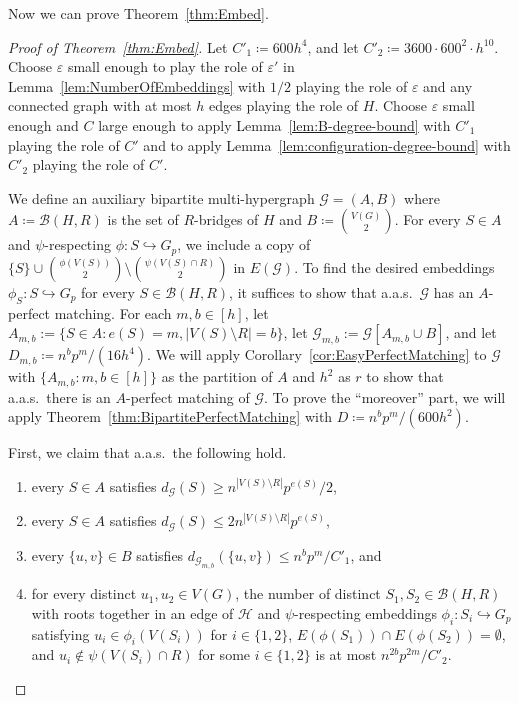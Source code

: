 \documentclass[11pt]{article}
\numberwithin{equation}{section}
\newcommand{\eps}{\varepsilon}
\newcounter{i}
\theoremstyle{plain}
\theoremstyle{plain} %
\theoremstyle{definition}
\newcommand{\cB}{\mathcal{B}}
\newcommand{\cH}{\mathcal{H}}
\newcommand{\cG}{\mathcal{G}}
\newcommand{\aas}{a.a.s.\ }
\begin{document}
Now we can prove Theorem~\ref{thm:Embed}.
\begin{proof}[Proof of Theorem~\ref{thm:Embed}]
Let $C'_1 \coloneqq 600h^4$, and let $C'_2 \coloneqq 3600\cdot 600^2\cdot h^{10}$.
Choose $\eps$ small enough to play the role of  $\eps'$ in Lemma~\ref{lem:NumberOfEmbeddings} with $1/2$ playing the role of $\eps$ and any connected graph with at most $h$ edges playing the role of $H$.
Choose $\eps$ small enough and $C$ large enough to apply Lemma~\ref{lem:B-degree-bound} with $C'_1$ playing the role of $C'$ and to apply Lemma~\ref{lem:configuration-degree-bound} with $C'_2$ playing the role of $C'$.


We define an auxiliary bipartite multi-hypergraph $\cG=(A,B)$ where $A \coloneqq \cB(H,R)$ is the set of $R$-bridges of $H$ and $B \coloneqq \binom{V(G)}{2}$.  
For every $S \in A$ and $\psi$-respecting $\phi : S \hookrightarrow G_p$, we include a copy of $\{S\} \cup \binom{\phi(V(S))}{2}\setminus \binom{\psi(V(S)\cap R)}{2}$ in $E(\cG)$.  
To find the desired embeddings $\phi_S : S \hookrightarrow G_p$ for every $S \in \cB(H, R)$, it suffices to show that \aas $\cG$ has an $A$-perfect matching.
For each $m, b\in [h]$, let $A_{m,b} := \{S\in A : e(S)=m, |V(S)\setminus R|=b\}$, let $\cG_{m,b} := \cG[A_{m,b}\cup B]$, and let $D_{m,b} \coloneqq n^b p^m / (16h^4)$.
We will apply Corollary~\ref{cor:EasyPerfectMatching} to $\cG$ with $\{A_{m,b} : m , b\in [h]\}$ as the partition of $A$ and $h^2$ as $r$ to show that \aas there is an $A$-perfect matching of $\cG$.  
To prove the ``moreover'' part, we will apply Theorem~\ref{thm:BipartitePerfectMatching} with $D \coloneqq n^b p^m / (600 h^2)$.

First, we claim that \aas the following hold.
\begin{enumerate}[label=(\alph*)]
    \item\label{embedding-theorem:A-degree-lower} every $S \in A$ satisfies $d_{\cG}(S) \geq n^{|V(S)\setminus R|}p^{e(S)} / 2$,
    \item\label{embedding-theorem:A-degree-upper} every $S \in A$ satisfies $d_{\cG}(S) \leq 2n^{|V(S)\setminus R|}p^{e(S)}$,
    \item\label{embedding-theorem:B-degree} every $\{u,v\}\in B$ satisfies $d_{\cG_{m,b}}(\{u,v\}) \leq n^bp^m / C'_1$, and
    \item\label{embedding-theorem:configuration-degree} for every distinct $u_1, u_2 \in V(G)$, the number of distinct $S_1,S_2 \in \cB(H,R)$ with roots together in an edge of $\cH$ and $\psi$-respecting embeddings $\phi_i : S_i \hookrightarrow G_p$ satisfying $u_i \in \phi_i(V(S_i))$ for $i \in \{1,2\}$, $E(\phi(S_1)) \cap E(\phi(S_2)) = \emptyset$, and $u_i \notin \psi(V(S_i) \cap R)$ for some $i \in \{1,2\}$ is at most $n^{2b}p^{2m} / C'_2$.
\end{enumerate}


\end{proof}
\end{document}
